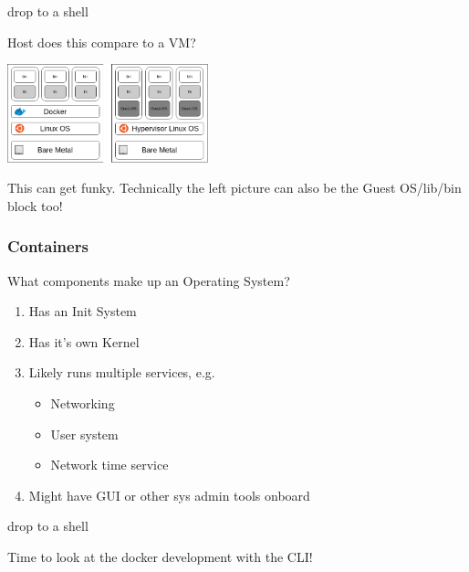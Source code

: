 \documentclass[11pt]{beamer}
\begin{document}
\begin{frame}
  \begin{center}
    drop to a shell
  \end{center}
\end{frame}

\begin{frame}
  \begin{center}
    Host does this compare to a VM?
  \end{center}
  \begin{center}
    \includegraphics[width=220px,keepaspectratio]{dockerVM}
  \end{center}
  \begin{center}
    This can get funky. Technically the left picture can also be the Guest OS/lib/bin block too!
  \end{center}
\end{frame}

\begin{frame}
  \frametitle{Containers}
  What components make up an Operating System?
  \begin{enumerate}
    \item Has an Init System
    \item Has it's own Kernel
    \item Likely runs multiple services, e.g.
    \begin{itemize}
      \item Networking
      \item User system
      \item Network time service
    \end{itemize}
   \item Might have GUI or other sys admin tools onboard
  \end{enumerate}
  drop to a shell
\end{frame}

\begin{frame}
  \begin{center}
    Time to look at the docker development with the CLI!
  \end{center}
\end{frame}
\end{document}
